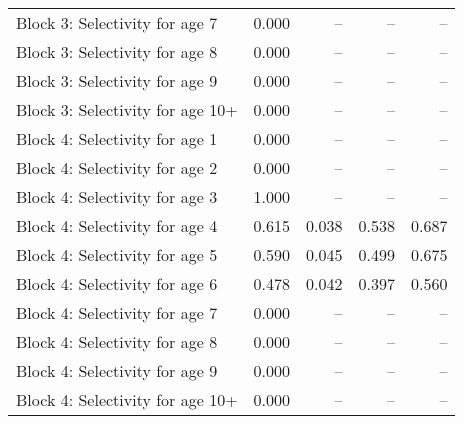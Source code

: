 \documentclass[
]{article}
\begin{document}
\begin{landscape}
\begin{longtable}[t]{lrrrr}
Block 3: Selectivity for age 7 & 0.000 & -- & -- & --\\
Block 3: Selectivity for age 8 & 0.000 & -- & -- & --\\
Block 3: Selectivity for age 9 & 0.000 & -- & -- & --\\
Block 3: Selectivity for age 10+ & 0.000 & -- & -- & --\\
\addlinespace
Block 4: Selectivity for age 1 & 0.000 & -- & -- & --\\
Block 4: Selectivity for age 2 & 0.000 & -- & -- & --\\
Block 4: Selectivity for age 3 & 1.000 & -- & -- & --\\
Block 4: Selectivity for age 4 & 0.615 & 0.038 & 0.538 & 0.687\\
Block 4: Selectivity for age 5 & 0.590 & 0.045 & 0.499 & 0.675\\
\addlinespace
Block 4: Selectivity for age 6 & 0.478 & 0.042 & 0.397 & 0.560\\
Block 4: Selectivity for age 7 & 0.000 & -- & -- & --\\
Block 4: Selectivity for age 8 & 0.000 & -- & -- & --\\
Block 4: Selectivity for age 9 & 0.000 & -- & -- & --\\
Block 4: Selectivity for age 10+ & 0.000 & -- & -- & --\\*
\end{longtable}
\end{landscape}
\end{document}

